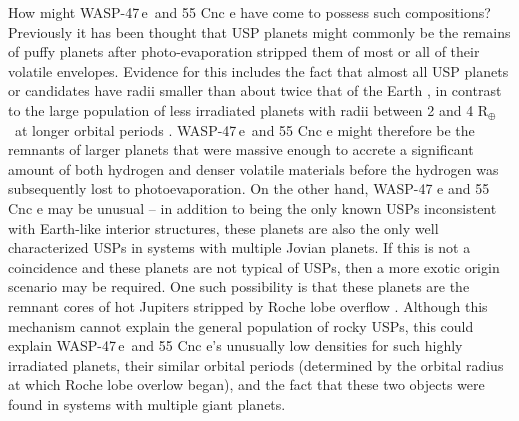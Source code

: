 \documentclass{emulateapj}
\newcommand{\ron}{\color{black}}
\newcommand{\thissecondplanet}{WASP-47\,e}
\newcommand{\rearth}{R$_\oplus$}
\begin{document}
How might \thissecondplanet\ and 55 Cnc e have come to possess such compositions? Previously it has been thought that USP planets might commonly be the remains of puffy planets {\ron \citep[but probably not hot Jupiters,][]{winnusp}} after photo-evaporation stripped them of most or all of their volatile envelopes. Evidence for this includes the fact that almost all USP planets or candidates have radii smaller than about twice that of the Earth \citep{jacksonusp, sanchisojedausp, lopez}, in contrast to the large population of less irradiated planets with radii between 2 and 4 \rearth\ at longer orbital periods \citep{fressin, petigura1}. \thissecondplanet\ and 55 Cnc e might therefore be the remnants of larger planets that were massive enough to accrete a significant amount of both hydrogen and denser volatile materials before the hydrogen was subsequently lost to photoevaporation. {\ron On the other hand, WASP-47 e and 55 Cnc e may be unusual -- in addition to being the only known USPs inconsistent with Earth-like interior structures, these planets are also the only well characterized USPs in systems with multiple Jovian planets. If this is not a coincidence and these planets are not typical of USPs, then a more exotic origin scenario may be required. One such possibility is that these planets are the remnant cores of hot Jupiters stripped by Roche lobe overflow \citep{valsecchi, jacksonhjusp}.  Although this mechanism cannot explain the general population of rocky USPs, this could explain \thissecondplanet\ and 55 Cnc e's unusually low densities for such highly irradiated planets, their similar orbital periods (determined by the orbital radius at which Roche lobe overlow began), and the fact that these two objects were found in systems with multiple giant planets.}
\end{document}
